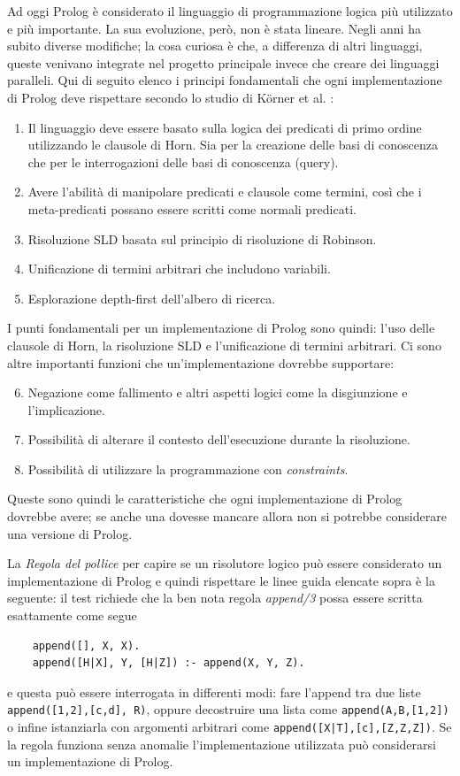 Ad oggi Prolog è considerato il linguaggio di programmazione logica più utilizzato e più importante. La sua evoluzione, però, non è stata lineare.
Negli anni ha subito diverse modifiche; la cosa curiosa è che, a differenza di altri linguaggi, queste venivano integrate nel progetto principale invece che creare dei linguaggi paralleli.
Qui di seguito elenco i principi fondamentali che ogni implementazione di Prolog deve rispettare secondo lo studio di K\"orner et al. \cite{korner2022fifty}:
\begin{enumerate}
    \item Il linguaggio deve essere basato sulla logica dei predicati di primo ordine utilizzando le clausole di Horn. Sia per la creazione delle basi di conoscenza che per le interrogazioni delle basi di conoscenza (query).
    \item Avere l'abilità di manipolare predicati e clausole come termini, così che i meta-predicati possano essere scritti come normali predicati.
    \item Risoluzione SLD \cite{kowalski1974predicate} basata sul principio di risoluzione di Robinson.
    \item Unificazione di termini arbitrari che includono variabili.
    \item Esplorazione depth-first dell'albero di ricerca.
\end{enumerate}
I punti fondamentali per un implementazione di Prolog sono quindi: l'uso delle clausole
di Horn, la risoluzione SLD e l'unificazione di termini arbitrari. Ci sono altre importanti funzioni che un'implementazione dovrebbe supportare:
\begin{enumerate}
    \setcounter{enumi}{5}
    \item Negazione come fallimento e altri aspetti logici come la disgiunzione e l'implicazione.
    \item Possibilità di alterare il contesto dell'esecuzione durante la risoluzione.
    \item Possibilità di utilizzare la programmazione con \textit{constraints}.
\end{enumerate} 
Queste sono quindi le caratteristiche che ogni implementazione di Prolog dovrebbe avere; se anche una dovesse mancare allora non si potrebbe considerare una versione di Prolog. 

La \textit{Regola del pollice} per capire se un risolutore logico può essere considerato un implementazione di Prolog e quindi rispettare le linee guida elencate sopra è la seguente:
il test richiede che la ben nota regola \textit{append/3} possa essere scritta esattamente come segue
\begin{lstlisting}
    append([], X, X).
    append([H|X], Y, [H|Z]) :- append(X, Y, Z).
\end{lstlisting}
e questa può essere interrogata in differenti modi: fare l'append tra due liste \verb+append([1,2],[c,d], R)+, oppure decostruire una lista come \verb+append(A,B,[1,2])+ o infine istanziarla con argomenti arbitrari come \verb+append([X|T],[c],[Z,Z,Z])+.
Se la regola funziona senza anomalie l'implementazione utilizzata può considerarsi un implementazione di Prolog.

